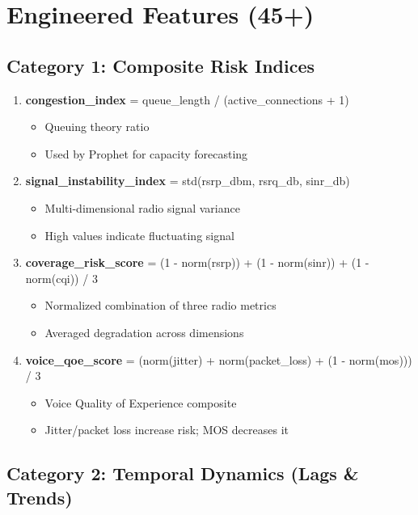 \documentclass[11pt,a4paper,oneside]{report}
\begin{document}
\section{Engineered Features (45+)}

\subsection{Category 1: Composite Risk Indices}

\begin{enumerate}
    \item \textbf{congestion\_index} = queue\_length / (active\_connections + 1)
        \begin{itemize}
            \item Queuing theory ratio
            \item Used by Prophet for capacity forecasting
        \end{itemize}

\item \textbf{signal\_instability\_index} = std(rsrp\_dbm, rsrq\_db, sinr\_db)
        \begin{itemize}
            \item Multi-dimensional radio signal variance
            \item High values indicate fluctuating signal
        \end{itemize}

\item \textbf{coverage\_risk\_score} = (1 - norm(rsrp)) + (1 - norm(sinr)) + (1 - norm(cqi)) / 3
        \begin{itemize}
            \item Normalized combination of three radio metrics
            \item Averaged degradation across dimensions
        \end{itemize}

\item \textbf{voice\_qoe\_score} = (norm(jitter) + norm(packet\_loss) + (1 - norm(mos))) / 3
        \begin{itemize}
            \item Voice Quality of Experience composite
            \item Jitter/packet loss increase risk; MOS decreases it
        \end{itemize}
\end{enumerate}

\subsection{Category 2: Temporal Dynamics (Lags \& Trends)}
\end{document}
